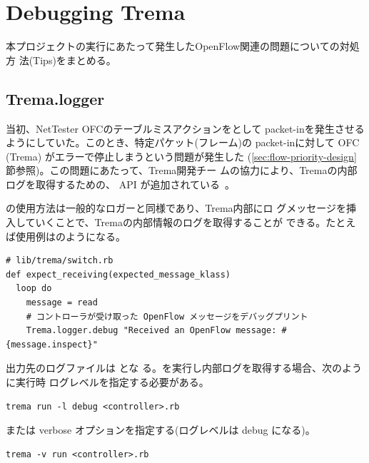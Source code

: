  \section{Debugging Trema}
 \label{sec:debugging-trema}

本プロジェクトの実行にあたって発生したOpenFlow関連の問題についての対処方
法(Tips)をまとめる。

  \subsection{Trema.logger}
  \label{sec:trema-logger}

当初、NetTester OFCのテーブルミスアクションをとして
packet-inを発生させるようにしていた。このとき、特定パケット(フレーム)の
packet-inに対して OFC (Trema) がエラーで停止しまうという問題が発生した
(\ref{sec:flow-priority-design}節参照)。この問題にあたって、Trema開発チー
ムの協力により、Tremaの内部ログを取得するための、 API
が追加されている~\cite{trema-logger-doc}。

の使用方法は一般的なロガーと同様であり、Trema内部にロ
グメッセージを挿入していくことで、Tremaの内部情報のログを取得することが
できる。たとえば使用例はのようになる。
\begin{lstlisting}[caption=\code{Trema.logger}使用例,label=lst:trema-logger-example]
# lib/trema/switch.rb
def expect_receiving(expected_message_klass)
  loop do
    message = read
    # コントローラが受け取った OpenFlow メッセージをデバッグプリント
    Trema.logger.debug "Received an OpenFlow message: #{message.inspect}"
\end{lstlisting}

出力先のログファイルは  とな
る。を実行し内部ログを取得する場合、次のように実行時
ログレベルを指定する必要がある。
\begin{lstlisting}[title=Trema実行時ログレベル指定(\code{-l}: log level option)]
trema run -l debug <controller>.rb
\end{lstlisting}
または verbose オプションを指定する(ログレベルは debug になる)。
\begin{lstlisting}[title=Trema実行時ログレベル指定(\code{-v}: verbose option)]
trema -v run <controller>.rb
\end{lstlisting}

